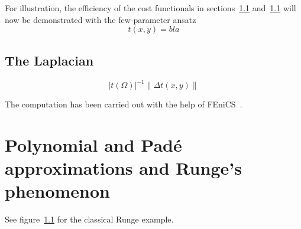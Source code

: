 \documentclass{scrartcl}
\theoremstyle{named}
\begin{document}
\section{}

For illustration, the efficiency of the cost functionals in sections~\ref{} and~\ref{}
will now be demonstrated with the few-parameter ansatz
\[
  t(x, y) = bla
\]




\subsection{The Laplacian}
\[
  |t(\Omega)|^{-1} \|\Delta t(x, y)\|
\]

The computation has been carried out with the help of FEniCS~\cite{fenics}.

\appendix

\section{Polynomial and Padé approximations and Runge's phenomenon}\label{polyfail}

See figure~\ref{} for the classical Runge example.



\end{document}
